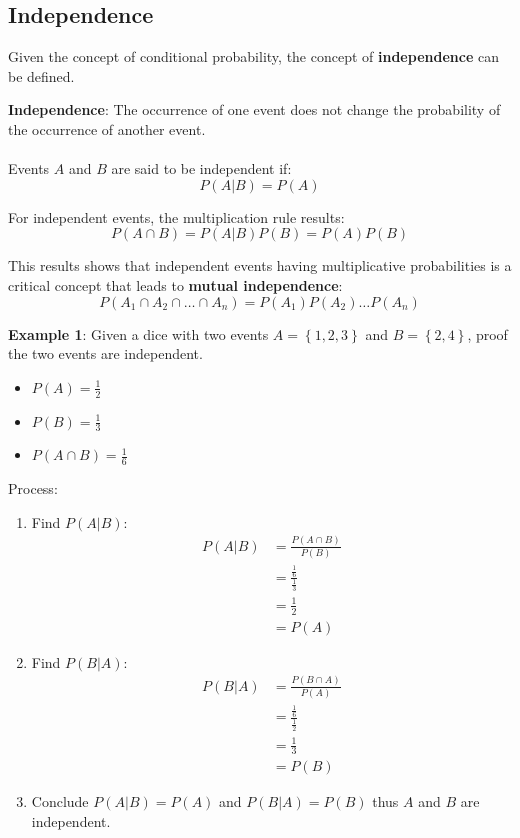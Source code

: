 \documentclass[10pt,a4paper]{article}
\begin{document}
\subsection{Independence}

Given the concept of conditional probability, the concept of \textbf{independence} can be defined.

\begin{tcolorbox}[breakable,colback=white]
\textbf{Independence}: The occurrence of one event does not change the probability of the occurrence
of another event.
\\
\\
Events $A$ and $B$ are said to be independent if:
$$
    P(A|B) = P(A)
$$
\end{tcolorbox}

For independent events, the multiplication rule results:
$$
    P(A\cap B) = P(A|B)P(B) = P(A)P(B)
$$

This results shows that independent events having multiplicative probabilities is a critical concept
that leads to \textbf{mutual independence}:
$$
    P(A_1 \cap A_2 \cap \dots \cap A_n) = P(A_1)P(A_2)\dots P(A_n)
$$

\textbf{Example 1}: Given a dice with two events $A=\left\{1,2,3\right\}$ and
$B=\left\{2,4\right\}$, proof the two events are independent.
\begin{itemize}
    \item $P(A)=\frac{1}{2}$
    \item $P(B)=\frac{1}{3}$
    \item $P(A\cap B)=\frac{1}{6}$
\end{itemize}

Process:
\begin{enumerate}
    \item Find $P(A|B)$:
    \begin{align*}
        P(A|B) &= \frac{P(A\cap B)}{P(B)} \\
        &= \frac{\frac{1}{6}}{\frac{1}{3}} \\
        &= \frac{1}{2}\\
        &= P(A)
    \end{align*}

    \item Find $P(B|A)$:
    \begin{align*}
        P(B|A) &= \frac{P(B\cap A)}{P(A)} \\
        &= \frac{\frac{1}{6}}{\frac{1}{2}} \\
        &= \frac{1}{3}\\
        &= P(B)
    \end{align*}

    \item Conclude $P(A|B)=P(A)$ and $P(B|A)=P(B)$ thus $A$ and $B$ are independent.
\end{enumerate}
\end{document}

